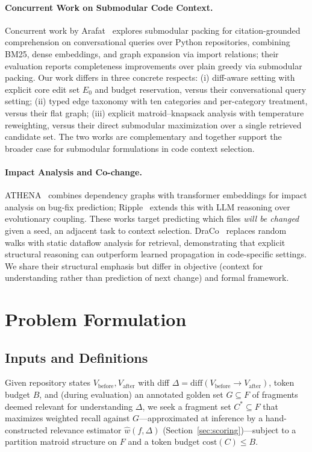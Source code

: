 \documentclass[11pt, a4paper]{article}
\begin{document}
\paragraph{Concurrent Work on Submodular Code Context.}
Concurrent work by Arafat~\cite{arafat2025citation} explores submodular packing for citation-grounded comprehension on conversational queries over Python repositories, combining BM25, dense embeddings, and graph expansion via import relations; their evaluation reports completeness improvements over plain greedy via submodular packing. Our work differs in three concrete respects: (i) diff-aware setting with explicit core edit set $E_0$ and budget reservation, versus their conversational query setting; (ii) typed edge taxonomy with ten categories and per-category treatment, versus their flat graph; (iii) explicit matroid--knapsack analysis with temperature reweighting, versus their direct submodular maximization over a single retrieved candidate set. The two works are complementary and together support the broader case for submodular formulations in code context selection.

\paragraph{Impact Analysis and Co-change.}
ATHENA~\cite{athena2024} combines dependency graphs with transformer embeddings for impact analysis on bug-fix prediction; Ripple~\cite{ripple2026} extends this with LLM reasoning over evolutionary coupling. These works target predicting which files \emph{will be changed} given a seed, an adjacent task to context selection. DraCo~\cite{draco2024} replaces random walks with static dataflow analysis for retrieval, demonstrating that explicit structural reasoning can outperform learned propagation in code-specific settings. We share their structural emphasis but differ in objective (context for understanding rather than prediction of next change) and formal framework.

\newpage
\section{Problem Formulation}
\label{sec:problem}

\subsection{Inputs and Definitions}

Given repository states $V_{\mathrm{before}}, V_{\mathrm{after}}$ with diff $\Delta = \mathrm{diff}(V_{\mathrm{before}} \to V_{\mathrm{after}})$, token budget $B$, and (during evaluation) an annotated golden set $G \subseteq F$ of fragments deemed relevant for understanding $\Delta$, we seek a fragment set $C^* \subseteq F$ that maximizes weighted recall against $G$---approximated at inference by a hand-constructed relevance estimator $\hat{w}(f, \Delta)$ (Section~\ref{sec:scoring})---subject to a partition matroid structure on $F$ and a token budget $\mathrm{cost}(C) \leq B$.
\end{document}
